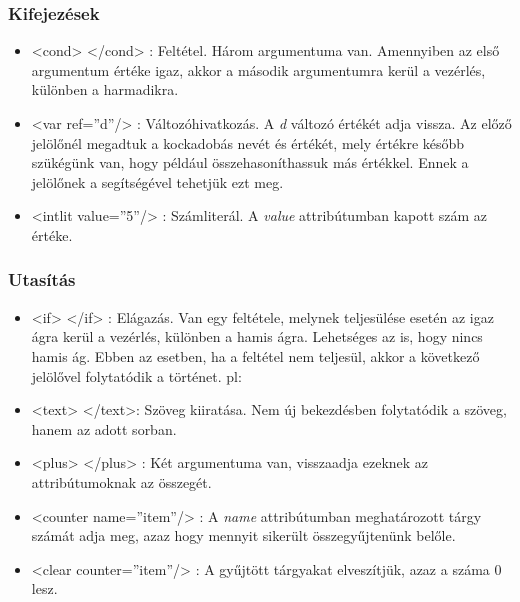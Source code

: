 \documentclass[12pt,a4paper,oneside]{report}
\newcommand{\attr}{\emph}
\begin{document}
      \subsubsection{Kifejezések}
        \begin{itemize}
          \item <{\color{Tag}cond}> <{\color{Tag}/cond}> : Feltétel. Három
            argumentuma van. Amennyiben az első argumentum értéke igaz,
            akkor a második argumentumra kerül a vezérlés, különben a
            harmadikra.
          \item <{\color{Tag}var} {\color{Attr}ref}={\color{Value}''d''}/>
            : Változóhivatkozás. A \emph{d} változó értékét adja
            vissza. Az előző jelölőnél megadtuk a kockadobás nevét és
            értékét, mely értékre később szükégünk van, hogy például
            összehasoníthassuk más értékkel. Ennek a jelölőnek a
            segítségével tehetjük ezt meg.
            
          \item <{\color{Tag}intlit}
            {\color{Attr}value}={\color{Value}''5''}/> : Számliterál. A
            \attr{value} attribútumban kapott szám az értéke.
    
        \end{itemize}

      \subsubsection{Utasítás}
        \begin{itemize}
          \item <{\color{Tag}if}> <{\color{Tag}/if}> : Elágazás. Van egy
            feltétele, melynek teljesülése esetén az igaz ágra kerül a
            vezérlés, különben a hamis ágra. Lehetséges az is, hogy nincs
            hamis ág. Ebben az esetben, ha a feltétel nem teljesül, akkor
            a következő jelölővel folytatódik a történet.  pl:

          \item <{\color{Tag}text}> <{\color{Tag}/text}>: Szöveg
            kiiratása. Nem új bekezdésben folytatódik a szöveg, hanem az
            adott sorban.

          \item <{\color{Tag}plus}> <{\color{Tag}/plus}> : Két argumentuma
            van, visszaadja ezeknek az attribútumoknak az összegét.

          \item <{\color{Tag}counter}
            {\color{Attr}name}={\color{Value}''item''}/> : A \attr{name}
            attribútumban meghatározott tárgy számát adja meg, azaz hogy
            mennyit sikerült összegyűjtenünk belőle.
            
          \item <{\color{Tag}clear}
            {\color{Attr}counter}={\color{Value}''item''}/> : A gyűjtött
            tárgyakat elveszítjük, azaz a száma 0 lesz.
      \end{itemize}
\end{document}
